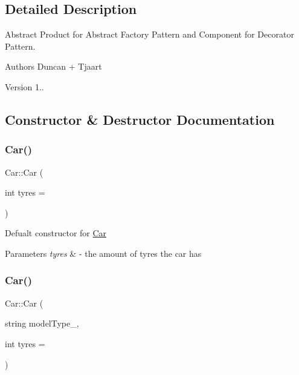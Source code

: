 \subsection{Detailed Description}
Abstract Product for Abstract Factory Pattern and Component for Decorator Pattern. 

\begin{DoxyAuthor}{Authors}
Duncan + Tjaart 
\end{DoxyAuthor}
\begin{DoxyVersion}{Version}
1.. 
\end{DoxyVersion}


\subsection{Constructor \& Destructor Documentation}
\mbox{\label{class_car_ab740ed295feccd6ba2ffcc954623fc36}} 
\subsubsection{\texorpdfstring{Car()}{Car()}\hspace{0.1cm}{\footnotesize\ttfamily [1/3]}}
{\footnotesize\ttfamily Car\+::\+Car (\begin{DoxyParamCaption}\item[{int}]{tyres = {} }\end{DoxyParamCaption})}

Defualt constructor for \mbox{\hyperlink{class_car}{Car}} 
\begin{DoxyParams}{Parameters}
{\em tyres} & -\/ the amount of tyres the car has \\
\hline
\end{DoxyParams}
\mbox{\label{class_car_ab471ee86f9ba3bc2637b526233932513}} 
\subsubsection{\texorpdfstring{Car()}{Car()}\hspace{0.1cm}{\footnotesize\ttfamily [2/3]}}
{\footnotesize\ttfamily Car\+::\+Car (\begin{DoxyParamCaption}\item[{string}]{model\+Type\+\_\+,  }\item[{int}]{tyres = {} }\end{DoxyParamCaption})}

